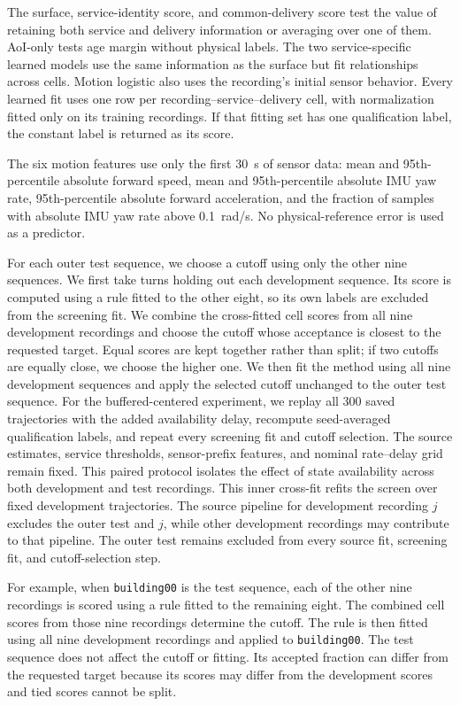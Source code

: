 \documentclass[journal]{IEEEtran}
\newcommand{\rev}[1]{#1}
\newcommand{\revision}[1]{#1}
\begin{document}
\revision{The surface, service-identity score, and common-delivery score
test the value of retaining both service and delivery information or
averaging over one of them. AoI-only tests age margin without physical
labels. The two service-specific learned models use the same information
as the surface but fit relationships across cells. Motion logistic also
uses the recording's initial sensor behavior. Every learned fit uses one
row per recording--service--delivery cell, with normalization fitted only
on its training recordings. If that fitting set has one qualification
label, the constant label is returned as its score.}

The six motion features use only the first 30~s of sensor data: mean and
95th-percentile absolute forward speed, mean and 95th-percentile
absolute IMU yaw rate, 95th-percentile absolute forward acceleration,
and the fraction of samples with absolute IMU yaw rate above
0.1~rad/s. No physical-reference error is used as a predictor.

For each outer test sequence, we choose a cutoff using only the other
nine sequences. We first take turns holding out each development
sequence. Its score is computed using a rule fitted to the other eight,
\rev{so its own labels are excluded from the screening fit.} We combine the cross-fitted cell
scores from all nine development recordings and choose the cutoff whose acceptance is closest to
the requested target. Equal scores are kept together rather than split;
if two cutoffs are equally close, we choose the higher one. We then fit
the method using all nine development sequences and apply the selected
cutoff unchanged to the outer test sequence.
\revision{For the buffered-centered experiment, we replay all 300 saved
trajectories with the added availability delay, recompute seed-averaged
qualification labels, and repeat every screening fit and cutoff selection.
The source estimates, service thresholds, sensor-prefix features, and
nominal rate--delay grid remain fixed. This paired protocol isolates the
effect of state availability across both development and test recordings.}
\rev{This inner cross-fit refits the screen over fixed development
trajectories. The source pipeline for development recording $j$ excludes
the outer test and $j$, while other development recordings may contribute
to that pipeline. The outer test remains excluded from every source fit,
screening fit, and cutoff-selection step.}

For example, when \texttt{building00} is the test sequence, each of the
other nine recordings is scored using a rule fitted to the remaining
eight. The combined cell scores from those nine recordings determine the
cutoff. The rule is then fitted
using all nine development recordings and applied to
\texttt{building00}. The test sequence does not affect the cutoff or
fitting. Its accepted fraction can differ from the requested target
because its scores may differ from the development scores and tied
scores cannot be split.
\end{document}
